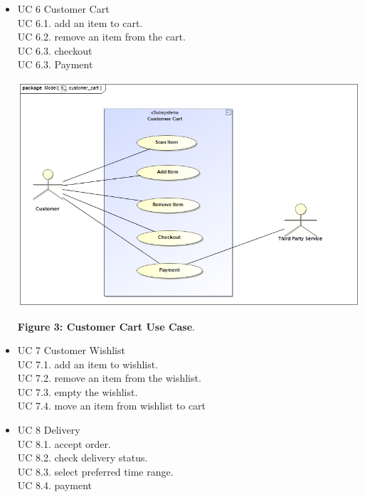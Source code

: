 \documentclass{article}
\begin{document}
\begin{itemize}
    \item[] UC 6 Customer Cart \\
     \indent UC 6.1. add an item to cart. \\
     \indent UC 6.2.  remove an item from the cart. \\
     \indent UC 6.3.  checkout \\
     \indent UC 6.3. Payment
     
    \includegraphics[scale=0.5]{customer_cart.jpg}
    \begin{center}
        \textbf{Figure 3: Customer Cart Use Case}. 
    \end{center}

    \item[] UC 7 Customer Wishlist \\
     \indent UC 7.1.  add an item to wishlist. \\
     \indent UC 7.2.  remove an item from the wishlist. \\
     \indent UC 7.3.  empty the wishlist. \\
     \indent UC 7.4.  move an item from wishlist to cart \\
    
    \item[] UC 8 Delivery \\
     \indent UC 8.1. accept order.\\
     \indent UC 8.2. check delivery status.\\
     \indent UC 8.3. select preferred time range.\\
     \indent UC 8.4. payment
     

\end{itemize}
\end{document}
